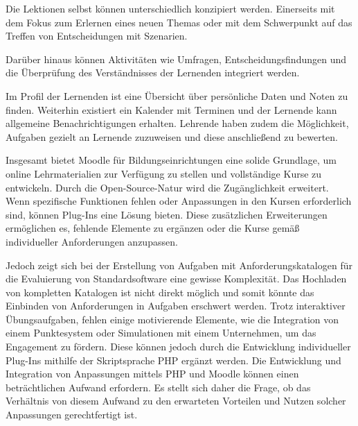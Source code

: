 Die Lektionen selbst können unterschiedlich konzipiert werden. Einerseits mit dem Fokus zum Erlernen eines neuen Themas oder mit dem Schwerpunkt auf das Treffen von Entscheidungen mit Szenarien.

Darüber hinaus können Aktivitäten wie Umfragen, Entscheidungsfindungen und die Überprüfung des Verständnisses der Lernenden integriert werden. 

Im Profil der Lernenden ist eine Übersicht über persönliche Daten und Noten zu finden. 
Weiterhin existiert ein Kalender mit Terminen und der Lernende kann allgemeine Benachrichtigungen erhalten.
Lehrende haben zudem die Möglichkeit, Aufgaben gezielt an Lernende zuzuweisen und diese anschließend zu bewerten.

Insgesamt bietet Moodle für Bildungseinrichtungen eine solide Grundlage, um online Lehrmaterialien zur Verfügung zu stellen und vollständige Kurse zu entwickeln. 
Durch die Open-Source-Natur wird die Zugänglichkeit erweitert. 
Wenn spezifische Funktionen fehlen oder Anpassungen in den Kursen erforderlich sind, können Plug-Ins eine Lösung bieten. Diese zusätzlichen Erweiterungen ermöglichen es, fehlende Elemente zu ergänzen oder die Kurse gemäß individueller Anforderungen anzupassen.

Jedoch zeigt sich bei der Erstellung von Aufgaben mit Anforderungskatalogen für die Evaluierung von Standardsoftware eine gewisse Komplexität. Das Hochladen von kompletten Katalogen ist nicht direkt möglich und somit könnte das Einbinden von Anforderungen in Aufgaben erschwert werden.
Trotz interaktiver Übungsaufgaben, fehlen einige motivierende Elemente, wie die Integration von einem Punktesystem oder Simulationen mit einem Unternehmen, um das Engagement zu fördern.
Diese können jedoch durch die Entwicklung individueller Plug-Ins mithilfe der Skriptsprache PHP ergänzt werden.
Die Entwicklung und Integration von Anpassungen mittels PHP und Moodle können einen beträchtlichen Aufwand erfordern. Es stellt sich daher die Frage, ob das Verhältnis von diesem Aufwand zu den erwarteten Vorteilen und Nutzen solcher Anpassungen gerechtfertigt ist.

